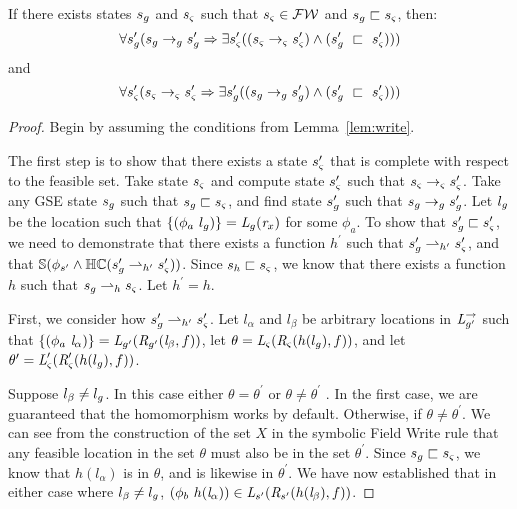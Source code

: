 \begin{lemma}
\label{lem:write}
If there exists states $s_{g}$ and $s_{\varsigma}$ such that $s_{\varsigma} \in \mathcal{FW}$ and $s_{g} \sqsubset s_{\varsigma}$, then:
\begin{equation}
\forall s_{g}^\prime ( s_{g} \rightarrow_{g} s_{g}^\prime \Rightarrow \exists s_{\varsigma}^\prime( (s_{\varsigma} \rightarrow_{\varsigma} s_{\varsigma}^\prime )\wedge (s_{g}^\prime\ \sqsubset\ s_{\varsigma}^\prime ))  )
\end{equation}
and
\begin{equation}
\forall s_{\varsigma}^\prime ( s_{\varsigma} \rightarrow_{\varsigma} s_{\varsigma}^\prime\Rightarrow \exists s_{g}^\prime( (s_{g} \rightarrow_{g} s_{g}^\prime )\wedge (s_{g}^\prime\ \sqsubset\ s_{\varsigma}^\prime ))  )
\end{equation}
\end{lemma}
\begin{proof}
Begin by assuming the conditions from Lemma~\ref{lem:write}.

The first step is to show that there exists a state $s_{\varsigma}^\prime$ that is complete with respect to the feasible set. Take state $s_{\varsigma}$ and compute state $s_{\varsigma}^\prime$ such that $s_{\varsigma} \rightarrow_{\varsigma} s_{\varsigma}^\prime$. Take any GSE state $s_{g}$ such that $s_{g} \sqsubset s_{\varsigma}$, and find state $s_{g}^\prime$ such that $s_{g} \rightarrow_{g} s_{g}^\prime$. Let $l_{g}$ be the location such that $\{(\phi_a\ l_{g} )\} = \emph{L}_{g}(\emph{r}_x) $ for some $\phi_a$. To show that $s_{g}^\prime \sqsubset s_{\varsigma}^\prime$, we need to demonstrate that there exists a function $h^\prime$ such that $s_{g}^\prime \rightharpoonup_{h^\prime} s_{\varsigma}^\prime$, and that $\mathbb{S}(\phi_{s^\prime} \wedge \mathbb{HC}(s_{g}^\prime \rightharpoonup_{h^\prime} s_{\varsigma}^\prime) )$. Since $s_h \sqsubset s_{\varsigma}$, we know that there exists a function $h$ such that $s_{g} \rightharpoonup_{h} s_{\varsigma}$. Let $h^\prime = h$. 

First, we consider how $s_{g}^\prime \rightharpoonup_{h^\prime} s_{\varsigma}^\prime$. Let $l_\alpha$ and $l_\beta$ be arbitrary locations in $\emph{L}_{g^\prime}^\rightarrow$ such that $\{(\phi_a\ \emph{l}_\alpha)\} = \emph{L}_{g^\prime}(\emph{R}_{g^\prime}(\emph{l}_\beta,f ))$, let $\theta = \emph{L}_{\varsigma}(\emph{R}_{\varsigma}(h(l_{g}),f))$, and let $\theta^\prime =   \emph{L}_{\varsigma}^\prime(\emph{R}_{\varsigma}^\prime(h(l_{g}),f))$. 

Suppose $l_\beta \neq l_{g}$. In this case either $\theta = \theta^\prime$ or $\theta \neq \theta^\prime$ . In the first case, we are guaranteed that the homomorphism works by default. Otherwise, if $\theta \neq \theta^\prime$.  We can see from the construction of the set $X$ in the symbolic Field Write rule that any feasible location in the set $\theta$ must also be in the set $\theta^\prime$. Since $s_{g} \sqsubset s_{\varsigma}$, we know that $h(l_\alpha)$ is in $\theta$, and is likewise in $\theta^\prime$. We have now established that in either case where $l_\beta \neq l_{g}$, $(\phi_b\ h(\emph{l}_\alpha))\in \emph{L}_{s^\prime}(\emph{R}_{s^\prime} (h(\emph{l}_\beta),f ))$.


\end{proof}

